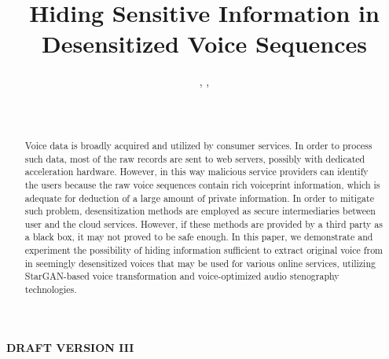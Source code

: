 \documentclass[journal]{IEEEtran} %
\begin{document}
\begin{CJK*}{UTF8}{gbsn}

\title{Hiding Sensitive Information in Desensitized Voice Sequences}

\author{%
    , %
    , %
    \\%
    \\%
    \\%
}

\maketitle

\textbf{DRAFT VERSION III}

\begin{abstract}
Voice data is broadly acquired and utilized by consumer services. In order to process such data, most of the raw records are sent to web servers, possibly with dedicated acceleration hardware. However, in this way malicious service providers can identify the users because the raw voice sequences contain rich voiceprint information, which is adequate for deduction of a large amount of private information. In order to mitigate such problem, desensitization methods are employed as secure intermediaries between user and the cloud services. However, if these methods are provided by a third party as a black box, it may not proved to be safe enough. In this paper, we demonstrate and experiment the possibility of hiding information sufficient to extract original voice from in seemingly desensitized voices that may be used for various online services, utilizing StarGAN-based voice transformation and voice-optimized audio stenography technologies.
\end{abstract}


\end{CJK*}
\end{document}
